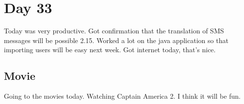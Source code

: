 \section{Day 33}
Today was very productive.
Got confirmation that the translation of SMS messages will be possible 2.15.
Worked a lot on the java application so that importing users will be easy next week.
Got internet today, that's nice.
\subsection{Movie}
Going to the movies today. Watching Captain America 2. 
I think it will be fun.
